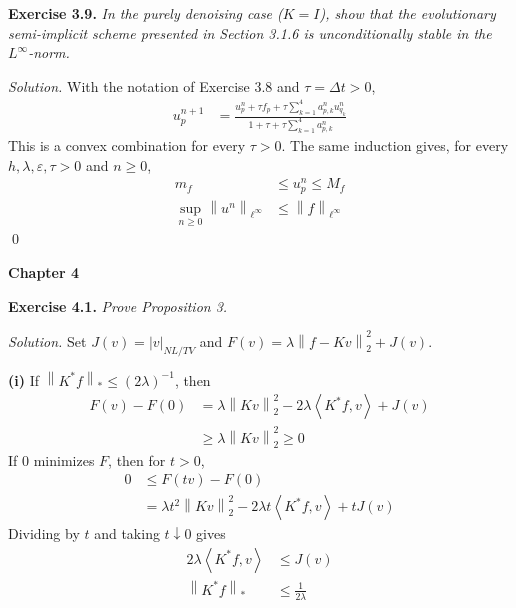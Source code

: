 \documentclass[12pt,letterpaper]{article}
\newcommand{\eps}{\varepsilon}
\newcommand{\norm}[1]{\left\lVert #1\right\rVert}
\newcommand{\ip}[2]{\left\langle #1,#2\right\rangle}
\newcommand{\exercise}[1]{%
  \par\bigskip\noindent\textbf{Exercise #1.}\enspace}
\newenvironment{statement}{\itshape\ignorespaces}{\par}
\newcommand{\solution}{\par\medskip\noindent\textit{Solution.}\enspace}
\newcommand{\partlabel}[1]{\par\medskip\noindent\textbf{(#1)}\enspace}
\newcommand{\finish}{\qed\par}
\begin{document}
\begin{samepage}
\exercise{3.9}
\begin{statement}
In the purely denoising case ($K=I$), show that the evolutionary semi-implicit scheme presented in Section 3.1.6 is unconditionally stable in the $L^\infty$-norm.
\end{statement}
\end{samepage}

\solution
With the notation of Exercise 3.8 and $\tau=\Delta t>0$,
\begin{align*}
 u^{n+1}_p
 &=\frac{u^n_p+\tau f_p+\tau\sum_{k=1}^4a^n_{p,k}u^n_{q_k}}
          {1+\tau+\tau\sum_{k=1}^4a^n_{p,k}}
\end{align*}
This is a convex combination for every $\tau>0$. The same induction
gives, for every $h,\lambda,\eps,\tau>0$ and $n\ge0$,
\begin{align*}
 m_f&\le u^n_p\le M_f\\
 \sup_{n\ge0}\norm{u^n}_{\ell^\infty}
 &\le\norm{f}_{\ell^\infty}
\end{align*}
\finish

\clearpage
{}
\begin{center}
\textbf{Chapter 4}
\end{center}

\exercise{4.1}
\begin{statement}
Prove Proposition 3.
\end{statement}
\solution
Set $J(v)=|v|_{NL/TV}$ and $F(v)=\lambda\norm{f-Kv}_2^2+J(v)$.

\partlabel{i}
If $\norm{K^*f}_*\leq(2\lambda)^{-1}$, then
\begin{align*}
 F(v)-F(0)
 &=\lambda\norm{Kv}_2^2-2\lambda\ip{K^*f}{v}+J(v)\\
 &\geq\lambda\norm{Kv}_2^2\geq0
\end{align*}
If $0$ minimizes $F$, then for $t>0$,
\begin{align*}
 0&\leq F(tv)-F(0)\\
 &=\lambda t^2\norm{Kv}_2^2-2\lambda t\ip{K^*f}{v}+tJ(v)
\end{align*}
Dividing by $t$ and taking $t\downarrow0$ gives
\begin{align*}
 2\lambda\ip{K^*f}{v}&\leq J(v)\\
 \norm{K^*f}_*&\leq\frac1{2\lambda}
\end{align*}
\end{document}
